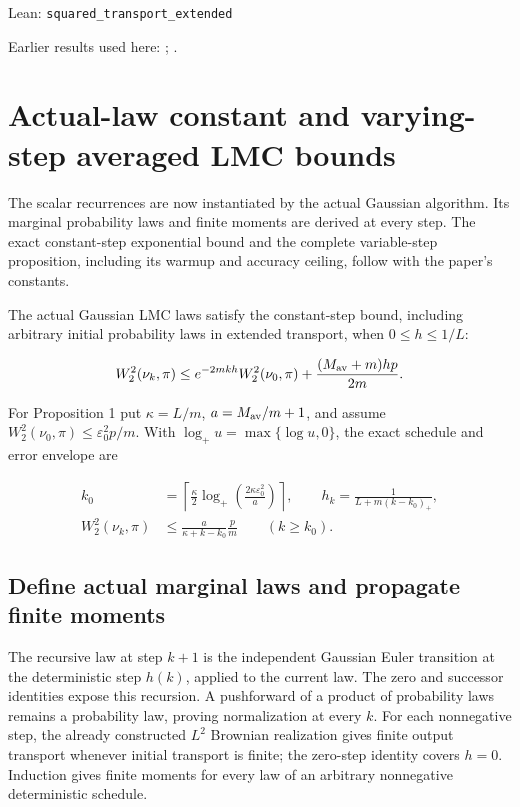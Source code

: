 \documentclass[11pt,a4paper]{report}
\begin{document}
\begin{leanbox}{Lean: \texttt{squared\_\allowbreak{}transport\_\allowbreak{}extended}}
\begin{enumerate}
\end{enumerate}
\end{leanbox}


Earlier results used here: \cite[Section~3.17.3]{LangevinLean2026ULASC}; \cite[Section~3.17.4]{LangevinLean2026ULASC}.
\section{\texorpdfstring{Actual-law constant and varying-step averaged LMC bounds}{Actual-law constant and varying-step averaged LMC bounds}}
\label{proof-module-AverageLMC-Theorem-lean}


The scalar recurrences are now instantiated by the actual Gaussian algorithm. Its marginal probability laws and finite moments are derived at every step. The exact constant-step exponential bound and the complete variable-step proposition, including its warmup and accuracy ceiling, follow with the paper’s constants.



The actual Gaussian LMC laws satisfy the constant-step bound, including arbitrary initial probability laws in extended transport, when \(0\le h\le1/L\):


\[W_2^2(\nu_k,\pi)\le e^{-2mkh}W_2^2(\nu_0,\pi)+\frac{(M_{\rm av}+m)hp}{2m}.\]


For Proposition 1 put \(\kappa=L/m\), \(a=M_{\rm av}/m+1\), and assume \(W_2^2(\nu_0,\pi)\le\varepsilon_0^2p/m\). With \(\log_+u=\max\{\log u,0\}\), the exact schedule and error envelope are


\[\begin{aligned}k_0&=\left\lceil\frac\kappa2\log_+\!\left(\frac{2\kappa\varepsilon_0^2}{a}\right)\right\rceil,\qquad h_k=\frac1{L+m(k-k_0)_+},\\ W_2^2(\nu_k,\pi)&\le\frac{a}{\kappa+k-k_0}\frac pm\qquad(k\ge k_0).\end{aligned}\]\subsection{\texorpdfstring{Define actual marginal laws and propagate finite moments}{Define actual marginal laws and propagate finite moments}}
\label{report-step-AverageLMC-Theorem-lean-1}


The recursive law at step \(k+1\) is the independent Gaussian Euler transition at the deterministic step \(h(k)\), applied to the current law. The zero and successor identities expose this recursion. A pushforward of a product of probability laws remains a probability law, proving normalization at every \(k\). For each nonnegative step, the already constructed \(L^{2}\) Brownian realization gives finite output transport whenever initial transport is finite; the zero-step identity covers \(h=0\). Induction gives finite moments for every law of an arbitrary nonnegative deterministic schedule.
\end{document}
